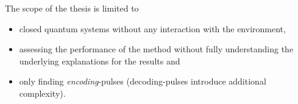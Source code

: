 \documentclass[main.tex]{subfiles}
\begin{document}
The scope of the thesis is limited to
\begin{itemize}
    \item closed quantum systems without any interaction with the environment,
    \item assessing the performance of the method without fully understanding the underlying explanations for the results and
    \item only finding \emph{encoding}-pulses (decoding-pulses introduce additional complexity).
\end{itemize}
\end{document}
